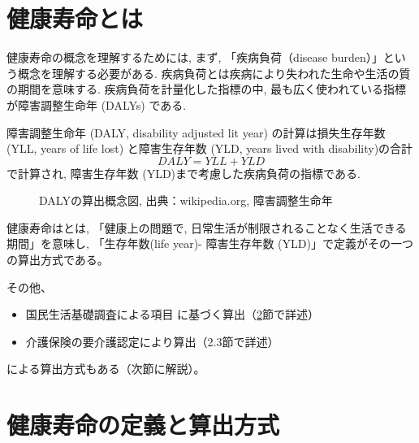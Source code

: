 \section{健康寿命とは}


健康寿命の概念を理解するためには, まず, 「疾病負荷（disease burden）」という概念を理解する必要がある. 疾病負荷とは疾病により失われた生命や生活の質の期間を意味する. 
疾病負荷を計量化した指標の中, 
最も広く使われている指標が障害調整生命年 (DALYs) である.

障害調整生命年 (DALY, disability adjusted lit year) の計算は損失生存年数 (YLL, years of life lost) と障害生存年数 (YLD, years lived with disability)の合計
	\begin{equation}
	\label{daly}
	DALY=YLL+YLD
	\end{equation}
	で計算され, 障害生存年数 (YLD)まで考慮した疾病負荷の指標である.



\begin{figure}[h!]
	\begin{center}
			\caption{DALYの算出概念図, 出典：wikipedia.org, 障害調整生命年
		}
	\end{center}
\end{figure}

健康寿命はとは, 「健康上の問題で, 日常生活が制限されることなく生活できる期間」を意味し, 「生存年数(life year)- 障害生存年数 (YLD)」で定義がその一つの算出方式である。

その他、

\begin{itemize}
\item 国民生活基礎調査による項目  に基づく算出（\ref{survey}節で詳述）
\item 介護保険の要介護認定により算出（2.3節で詳述）
\end{itemize}
による算出方式もある（次節に解説）。



\section{健康寿命の定義と算出方式}
\label{survey}
%

